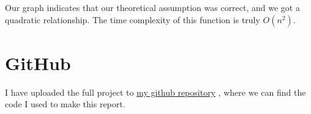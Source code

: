 \documentclass[a4paper,11pt]{article}
\newcommand{\underlinehref}[2]{%
  \href{#1}{\ul{#2}}%
}
\begin{document}
Our graph indicates that our theoretical assumption was correct, and we got a quadratic relationship.
The time complexity of this function is truly $O(n^2)$.

\section*{GitHub}

I have uploaded the full project to \underlinehref{https://github.com/peterherczku}{my github repository}, where we can find the code I used to make this report.
\end{document}
